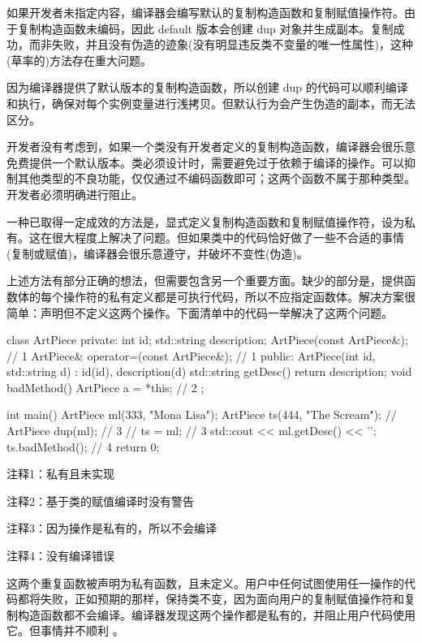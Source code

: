 
如果开发者未指定内容，编译器会编写默认的复制构造函数和复制赋值操作符。由于复制构造函数未编码，因此 default 版本会创建 dup 对象并生成副本。复制成功，而非失败，并且没有伪造的迹象(没有明显违反类不变量的唯一性属性)，这种(草率的)方法存在重大问题。

因为编译器提供了默认版本的复制构造函数，所以创建 dup 的代码可以顺利编译和执行，确保对每个实例变量进行浅拷贝。但默认行为会产生伪造的副本，而无法区分。

开发者没有考虑到，如果一个类没有开发者定义的复制构造函数，编译器会很乐意免费提供一个默认版本。类必须设计时，需要避免过于依赖于编译的操作。可以抑制其他类型的不良功能，仅仅通过不编码函数即可；这两个函数不属于那种类型。开发者必须明确进行阻止。

一种已取得一定成效的方法是，显式定义复制构造函数和复制赋值操作符，设为私有。这在很大程度上解决了问题。但如果类中的代码恰好做了一些不合适的事情(复制或赋值)，编译器会很乐意遵守，并破坏不变性(伪造)。


上述方法有部分正确的想法，但需要包含另一个重要方面。缺少的部分是，提供函数体的每个操作符的私有定义都是可执行代码，所以不应指定函数体。解决方案很简单：声明但不定义这两个操作。下面清单中的代码一举解决了这两个问题。


\begin{cpp}
class ArtPiece {
private:
  int id;
  std::string description;
  ArtPiece(const ArtPiece&); // 1
  ArtPiece& operator=(const ArtPiece&); // 1
public:
  ArtPiece(int id, std::string d) : id(id), description(d) {}
  std::string getDesc() { return description; }
  void badMethod() { ArtPiece a = *this; } // 2
};

int main() {
  ArtPiece ml(333, "Mona Lisa");
  ArtPiece ts(444, "The Scream");
  // ArtPiece dup(ml); // 3
  // ts = ml; // 3
  std::cout << ml.getDesc() << '\n';
  ts.badMethod(); // 4
  return 0;
}
\end{cpp}

{\footnotesize
注释1：私有且未实现

注释2：基于类的赋值编译时没有警告

注释3：因为操作是私有的，所以不会编译

注释4：没有编译错误
}

这两个重复函数被声明为私有函数，且未定义。用户中任何试图使用任一操作的代码都将失败，正如预期的那样，保持类不变，因为面向用户的复制赋值操作符和复制构造函数都不会编译。编译器发现这两个操作都是私有的，并阻止用户代码使用它。但事情并不顺利 。


